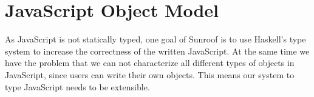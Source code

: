  
\section{JavaScript Object Model}
\label{sec:object-model}

\begin{comment}
JavaScript is object based. It provides various objects,
including numbers, booleans, maps, and others. We
provide in Sunroof about a dozen common object,
including \Src{JSObject} (the generic object type), \Src{JSNumber}
(floating point numbers), \Src{JSCanvas} (HTML5 canvas type) 
and others. A simple
casting function is provided when the type-system
needs to be overwritten. Along with each of these types,
we provide typed methods.
\begin{Code}
 jsDrawBox :: JSObject -> JS t ()
 jsDrawBox document = do
     foo <- document # getElementById("foo")
     cxt <- foo # getContext("2d")     cxt # drawRect (0,0,100,100)
\end{Code}
Here, \Src{\#} is a reverse apply, so the types
of the function in the above example are
\begin{Code}
(#) :: o -> (o -> JS t a) -> JS t a
getElementById :: JSString -> JSObject -> JS t JSContext
getContext :: JSString -> JSContext -> JS t JSCanvas
drawRect :: (JSNumber,JSNumber,JSNumber,JSNumber) -> JSCanvas -> JS t ()
\end{Code}        
From experience, even though we are targeting
an untyped language, the type system gets in the
way less than we expected.
\end{comment}

As JavaScript is not statically typed, one goal
of Sunroof is to use Haskell's type system to
increase the correctness of the written JavaScript.
At the same time we have the problem that we can not characterize 
all different types of objects in JavaScript, since 
users can write their own objects. This means our 
system to type JavaScript needs to be extensible.

